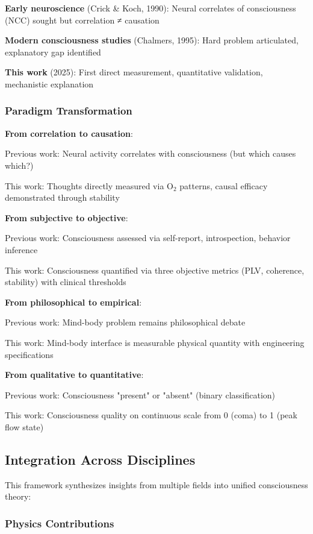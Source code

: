 \documentclass[11pt,onecolumn]{article}
\begin{document}
\textbf{Early neuroscience} (Crick \& Koch, 1990): Neural correlates of consciousness (NCC) sought but correlation ≠ causation

\textbf{Modern consciousness studies} (Chalmers, 1995): Hard problem articulated, explanatory gap identified

\textbf{This work} (2025): First direct measurement, quantitative validation, mechanistic explanation

\subsubsection{Paradigm Transformation}

\textbf{From correlation to causation}:

Previous work: Neural activity correlates with consciousness (but which causes which?)

This work: Thoughts directly measured via O$_2$ patterns, causal efficacy demonstrated through stability

\textbf{From subjective to objective}:

Previous work: Consciousness assessed via self-report, introspection, behavior inference

This work: Consciousness quantified via three objective metrics (PLV, coherence, stability) with clinical thresholds

\textbf{From philosophical to empirical}:

Previous work: Mind-body problem remains philosophical debate

This work: Mind-body interface is measurable physical quantity with engineering specifications

\textbf{From qualitative to quantitative}:

Previous work: Consciousness "present" or "absent" (binary classification)

This work: Consciousness quality on continuous scale from 0 (coma) to 1 (peak flow state)

\subsection{Integration Across Disciplines}

This framework synthesizes insights from multiple fields into unified consciousness theory:

\subsubsection{Physics Contributions}
\end{document}
